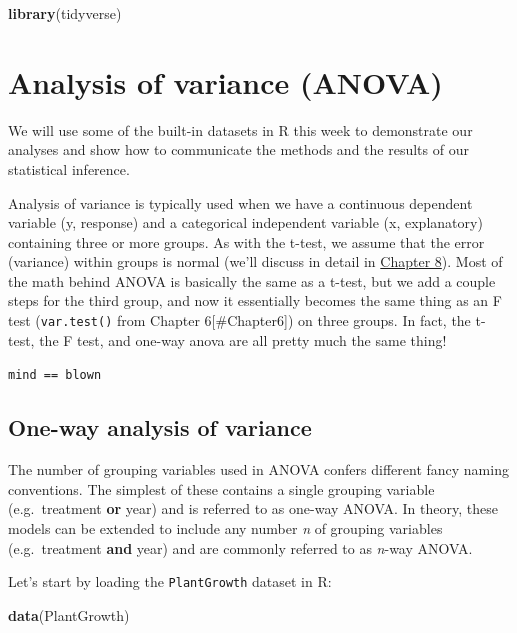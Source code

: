 \documentclass[
]{book}
\newenvironment{Shaded}{\begin{snugshade}}{\end{snugshade}}
\newcommand{\KeywordTok}[1]{\textcolor[rgb]{0.13,0.29,0.53}{\textbf{#1}}}
\newcommand{\NormalTok}[1]{#1}
\begin{document}
\begin{Shaded}
\begin{Highlighting}[]
\KeywordTok{library}\NormalTok{(tidyverse)}
\end{Highlighting}
\end{Shaded}

\hypertarget{anova}{%
\section{Analysis of variance (ANOVA)}\label{anova}}

We will use some of the built-in datasets in R this week to demonstrate our analyses and show how to communicate the methods and the results of our statistical inference.

Analysis of variance is typically used when we have a continuous dependent variable (y, response) and a categorical independent variable (x, explanatory) containing three or more groups. As with the t-test, we assume that the error (variance) within groups is normal (we'll discuss in detail in \protect\hyperlink{Chapter8}{Chapter 8}). Most of the math behind ANOVA is basically the same as a t-test, but we add a couple steps for the third group, and now it essentially becomes the same thing as an F test (\texttt{var.test()} from Chapter 6{[}\#Chapter6{]}) on three groups. In fact, the t-test, the F test, and one-way anova are all pretty much the same thing!

\texttt{mind\ ==\ blown}

\hypertarget{one-way}{%
\subsection{One-way analysis of variance}\label{one-way}}

The number of grouping variables used in ANOVA confers different fancy naming conventions. The simplest of these contains a single grouping variable (e.g.~treatment \textbf{or} year) and is referred to as one-way ANOVA. In theory, these models can be extended to include any number \emph{n} of grouping variables (e.g.~treatment \textbf{and} year) and are commonly referred to as \emph{n}-way ANOVA.

Let's start by loading the \texttt{PlantGrowth} dataset in R:

\begin{Shaded}
\begin{Highlighting}[]
\KeywordTok{data}\NormalTok{(PlantGrowth)}
\end{Highlighting}
\end{Shaded}
\end{document}
